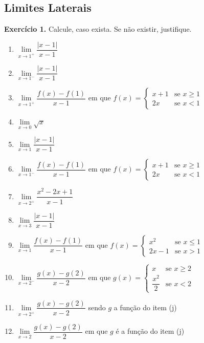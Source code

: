 \documentclass[12pt,a4paper]{article}
\begin{document}
\subsection{Limites Laterais}
\vspace{0.5cm}
\noindent\textbf{Exercício 1.} Calcule, caso exista. Se não existir, justifique.
\begin{enumerate}
    \renewcommand{\theenumi}{\alph{enumi}}
    \renewcommand{\labelenumi}{\theenumi)}
    \item $\lim\limits_{x \to 1^+} \dfrac{|x - 1|}{x - 1}$
    \item $\lim\limits_{x \to 1^-} \dfrac{|x - 1|}{x - 1}$
    \item $\lim\limits_{x \to 1^+} \dfrac{f(x) - f(1)}{x - 1}$ em que $f(x) = \begin{cases} x + 1 & \text{se } x \ge 1 \\ 2x & \text{se } x < 1 \end{cases}$
    \item $\lim\limits_{x \to 0} \sqrt{x}$
    \item $\lim\limits_{x \to 1} \dfrac{|x - 1|}{x - 1}$
    \item $\lim\limits_{x \to 1^-} \dfrac{f(x) - f(1)}{x - 1}$ em que $f(x) = \begin{cases} x + 1 & \text{se } x \ge 1 \\ 2x & \text{se } x < 1 \end{cases}$
    \item $\lim\limits_{x \to 2^+} \dfrac{x^2 - 2x + 1}{x - 1}$
    \item $\lim\limits_{x \to 3} \dfrac{|x - 1|}{x - 1}$
    \item $\lim\limits_{x \to 1} \dfrac{f(x) - f(1)}{x - 1}$ em que $f(x) = \begin{cases} x^2 & \text{se } x \le 1 \\ 2x - 1 & \text{se } x > 1 \end{cases}$
    \item $\lim\limits_{x \to 2^-} \dfrac{g(x) - g(2)}{x - 2}$ em que $g(x) = \begin{cases} x & \text{se } x \ge 2 \\ \dfrac{x^2}{2} & \text{se } x < 2 \end{cases}$
    \item $\lim\limits_{x \to 2^+} \dfrac{g(x) - g(2)}{x - 2}$ sendo $g$ a função do item (j)
    \item $\lim\limits_{x \to 2} \dfrac{g(x) - g(2)}{x - 2}$ em que $g$ é a função do item (j)
\end{enumerate}
\end{document}
